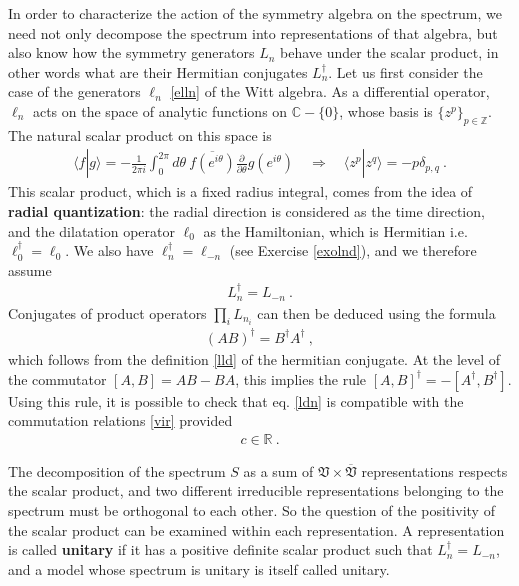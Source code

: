 \documentclass[12pt,a4paper,notitlepage]{report}
\numberwithin{equation}{section}
\theoremstyle{break}
\begin{document}
In order to characterize the action of the symmetry algebra on the spectrum, we need not only decompose the spectrum into representations of that algebra, but also know how the symmetry generators $L_n$ behave under the scalar product, in other words what are their Hermitian conjugates $L_n^\dagger$.
Let us first consider the case of the generators $\ell_n$ \eqref{elln} of the Witt algebra.  
As a differential operator, $\ell_n$ acts on the space of analytic functions on ${\mathbb{C}}-\{0\}$, whose basis is $\{z^p\}_{p\in{\mathbb{Z}}}$.
The natural scalar product on this space is 
\begin{align}
 \langle f|g\rangle = -\frac{1}{2\pi i}\int_0^{2\pi}d\theta\  \overline{f(e^{i\theta})} {\frac{\partial}{\partial \theta}} g(e^{i\theta}) \quad \Rightarrow \quad \langle z^p| z^q \rangle = -p\delta_{p,q}\ .
\label{fgd}
\end{align}
This scalar product, which is a fixed radius integral, comes from the idea of \textbf{\boldmath radial quantization}: the radial direction is considered as the time direction, and the dilatation operator $\ell_0$ as the Hamiltonian, which is Hermitian i.e. $\ell_0^\dagger = \ell_0$.
We also have $\ell_n^\dagger = \ell_{-n}$ (see Exercise \ref{exolnd}), and we therefore assume
\begin{align}
 \boxed{L^\dagger_n = L_{-n}} \ .
\label{ldn}
\end{align}
Conjugates of product operators $\prod_i L_{n_i}$ can then be deduced using the formula
\begin{align}
 (AB)^\dagger = B^\dagger A^\dagger\ , 
\label{abba}
\end{align}
which follows from the definition \eqref{lld} of the hermitian conjugate.
At the level of the commutator $[A,B]=AB-BA$, this implies
the rule $[A,B]^\dagger = -[A^\dagger,B^\dagger]$. 
Using this rule, it is possible to check that eq. \eqref{ldn} is compatible with the commutation relations \eqref{vir} provided
\begin{align}
 c\in {\mathbb{R}}\ .
\label{cir}
\end{align}

The decomposition of the spectrum $S$ as a sum of $\mathfrak{V}\times \overline{\mathfrak{V}}$ representations respects the scalar product, and two different irreducible representations belonging to the spectrum must be orthogonal to each other.
So the question of the positivity of the scalar product can be examined within each representation.
A representation is called \textbf{\boldmath unitary} if it has a positive definite scalar product such that 
$L^\dagger_n = L_{-n}$, and a model whose spectrum is unitary is itself called unitary. 
\end{document}
